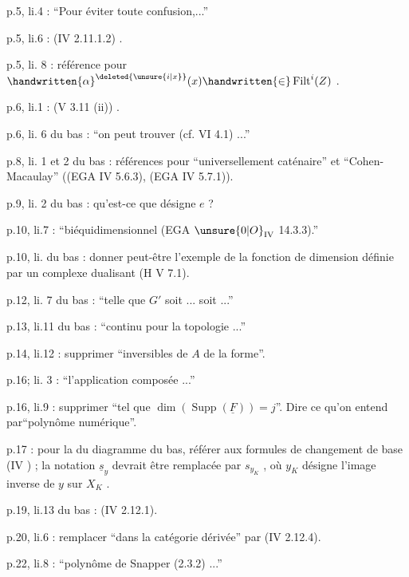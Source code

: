 p.5, li.4 : ``Pour  éviter toute confusion,...''

p.5, li.6 : (IV 2.11.1.2) .

p.5, li. 8 : référence  pour $\handwritten{\alpha}^{\deleted{\unsure{i|x}}}(x)\handwritten{\in}\operatorname{Filt}^{i}(Z)$ .

p.6, li.1 : (V 3.11 (ii)) .

p.6, li. 6 du bas : ``on peut trouver (cf. VI 4.1) ...''

p.8, li. 1 et 2 du bas : références pour ``universellement caténaire'' et ``Cohen-Macaulay'' ((EGA IV 5.6.3), (EGA IV 5.7.1)). 


p.9, li. 2 du bas : qu'est-ce que désigne $e$ ?

p.10, li.7 : ``biéquidimensionnel (EGA $\unsure{0|O}_{\mathrm{IV}}$ 14.3.3).''

p.10, li. du bas : donner peut-être l'exemple de la fonction de dimension définie par un complexe dualisant (\handwritten{[}H\handwritten{]} V 7.1).

p.12, li. 7 du bas : ``telle que $G'$ soit ... soit ...''

p.13, li.11 du bas : ``continu pour la topologie ...''

p.14, li.12 : supprimer ``inversibles de $A$ de la forme''.

p.16; li. 3 : ``l'application composée ...''

p.16, li.9 : supprimer ``tel que $\dim(\operatorname{Supp}(\underline{F}))=j$''. Dire ce qu'on entend par``polynôme numérique''.

p.17 : pour la  du diagramme du bas, référer aux formules de changement de base (IV \hspace{3em}) ; la notation $\underline{s}_y$ devrait être remplacée par $s_{y_K}$ , où $y_K$ désigne l'image inverse de $y$ sur $X_K$ .

p.19, li.13 du bas : (IV 2.12.1).

p.20, li.6 : remplacer ``dans la catégorie dérivée'' par (IV 2.12.4).

p.22, li.8 : ``polynôme de Snapper (2.3.2) ...''

